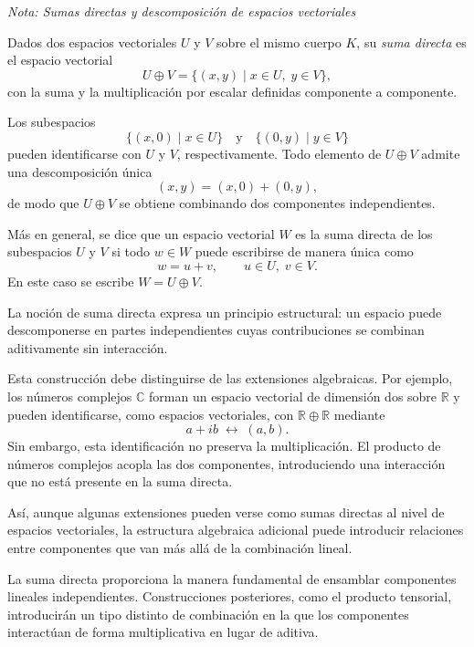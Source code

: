 \textit{Nota: Sumas directas y descomposición de espacios vectoriales \cite{halmos}}

\medskip

Dados dos espacios vectoriales $U$ y $V$ sobre el mismo cuerpo $K$,
su \emph{suma directa} es el espacio vectorial
\[
U \oplus V
=
\{(x,y) \mid x \in U,\; y \in V\},
\]
con la suma y la multiplicación por escalar definidas componente a componente.

\medskip

Los subespacios
\[
\{(x,0) \mid x \in U\}
\quad\text{y}\quad
\{(0,y) \mid y \in V\}
\]
pueden identificarse con $U$ y $V$, respectivamente.
Todo elemento de $U \oplus V$ admite una descomposición única
\[
(x,y) = (x,0) + (0,y),
\]
de modo que $U \oplus V$ se obtiene combinando dos componentes independientes.

\medskip

Más en general, se dice que un espacio vectorial $W$ es la suma directa de los subespacios
$U$ y $V$ si todo $w \in W$ puede escribirse de manera única como
\[
w = u + v,
\qquad
u \in U,\; v \in V.
\]
En este caso se escribe $W = U \oplus V$.

\medskip

La noción de suma directa expresa un principio estructural:
un espacio puede descomponerse en partes independientes cuyas contribuciones
se combinan aditivamente sin interacción.

\medskip

Esta construcción debe distinguirse de las extensiones algebraicas.
Por ejemplo, los números complejos $\mathbb{C}$ forman un espacio vectorial
de dimensión dos sobre $\mathbb{R}$ y pueden identificarse, como espacios vectoriales,
con $\mathbb{R} \oplus \mathbb{R}$ mediante
\[
a + ib \;\longleftrightarrow\; (a,b).
\]
Sin embargo, esta identificación no preserva la multiplicación.
El producto de números complejos acopla las dos componentes,
introduciendo una interacción que no está presente en la suma directa.

\medskip

Así, aunque algunas extensiones pueden verse como sumas directas al nivel de
espacios vectoriales, la estructura algebraica adicional puede introducir relaciones
entre componentes que van más allá de la combinación lineal.

\medskip

La suma directa proporciona la manera fundamental de ensamblar componentes lineales independientes.
Construcciones posteriores, como el producto tensorial, introducirán un tipo distinto
de combinación en la que los componentes interactúan de forma multiplicativa en lugar de aditiva.

